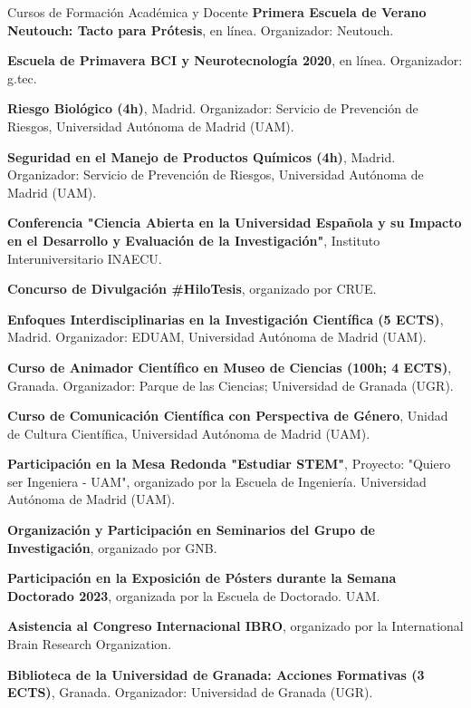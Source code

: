 \begin{rubric}{Cursos de Formación Académica y Docente}
	\entry*[Octubre 2020] \textbf{Primera Escuela de Verano Neutouch: Tacto para Prótesis}, en línea. Organizador: Neutouch.
	
	\entry*[Abril 2020] \textbf{Escuela de Primavera BCI y Neurotecnología 2020}, en línea. Organizador: g.tec.
	
	
	\entry*[18 de junio de 2019] \textbf{Riesgo Biológico (4h)}, Madrid. Organizador: Servicio de Prevención de Riesgos, Universidad Autónoma de Madrid (UAM).
	
	\entry*[4 de julio de 2019] \textbf{Seguridad en el Manejo de Productos Químicos (4h)}, Madrid. Organizador: Servicio de Prevención de Riesgos, Universidad Autónoma de Madrid (UAM).
		
	\entry*[25 de enero de 2023] \textbf{Conferencia "Ciencia Abierta en la Universidad Española y su Impacto en el Desarrollo y Evaluación de la Investigación"}, Instituto Interuniversitario INAECU.
	
	\entry*[Mayo 2021] \textbf{Concurso de Divulgación \#HiloTesis}, organizado por CRUE.
	
	 \textbf{Enfoques Interdisciplinarias en la Investigación Científica (5 ECTS)}, Madrid. Organizador: EDUAM, Universidad Autónoma de Madrid (UAM).
	
	 \textbf{Curso de Animador Científico en Museo de Ciencias (100h; 4 ECTS)}, Granada. Organizador: Parque de las Ciencias; Universidad de Granada (UGR).

	\entry*[Febrero 2024] \textbf{Curso de Comunicación Científica con Perspectiva de Género}, Unidad de Cultura Científica, Universidad Autónoma de Madrid (UAM).
	
	\entry*[Junio 2022] \textbf{Participación en la Mesa Redonda "Estudiar STEM"}, Proyecto: "Quiero ser Ingeniera - UAM", organizado por la Escuela de Ingeniería. Universidad Autónoma de Madrid (UAM).
	

	 \textbf{Organización y Participación en Seminarios del Grupo de Investigación}, organizado por GNB.
	
	\entry*[Junio 2023] \textbf{Participación en la Exposición de Pósters durante la Semana Doctorado 2023}, organizada por la Escuela de Doctorado. UAM.
	
	\entry*[Septiembre 2023] \textbf{Asistencia al Congreso Internacional IBRO}, organizado por la International Brain Research Organization.
	
	 \textbf{Biblioteca de la Universidad de Granada: Acciones Formativas (3 ECTS)}, Granada. Organizador: Universidad de Granada (UGR).
	
\end{rubric}
